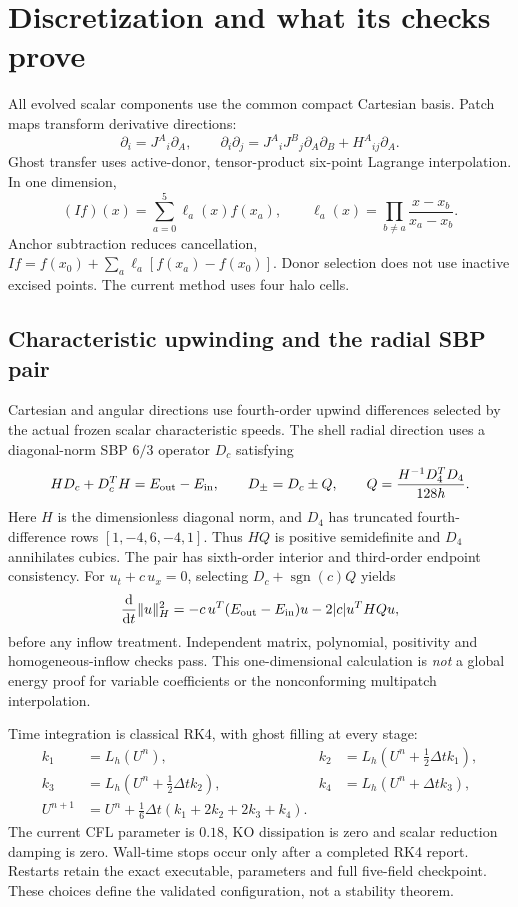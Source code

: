 \documentclass[11pt,letterpaper]{article}
\newcommand{\dd}{\mathrm{d}}
\begin{document}
\clearpage
\section{Discretization and what its checks prove}
All evolved scalar components use the common compact Cartesian basis. Patch maps transform derivative directions:
\begin{equation}
 \partial_i=J^A{}_i\partial_A,\qquad
 \partial_i\partial_j=J^A{}_iJ^B{}_j\partial_A\partial_B+H^A{}_{ij}\partial_A.
\end{equation}
Ghost transfer uses active-donor, tensor-product six-point Lagrange interpolation. In one dimension,
\begin{equation}
 (If)(x)=\sum_{a=0}^{5}\ell_a(x)f(x_a),\qquad
 \ell_a(x)=\prod_{b\ne a}\frac{x-x_b}{x_a-x_b}.
\end{equation}
Anchor subtraction reduces cancellation, $If=f(x_0)+\sum_a\ell_a[f(x_a)-f(x_0)]$. Donor selection does not use inactive excised points. The current method uses four halo cells.

\subsection{Characteristic upwinding and the radial SBP pair}
Cartesian and angular directions use fourth-order upwind differences selected by the actual frozen scalar characteristic speeds. The shell radial direction uses a diagonal-norm SBP $6/3$ operator $D_c$ satisfying
\begin{equation}
 HD_c+D_c^{T}H=E_{\rm out}-E_{\rm in},\qquad
 D_\pm=D_c\pm Q,\qquad Q=\frac{H^{-1}D_4^{T}D_4}{128h}.
\end{equation}
Here $H$ is the dimensionless diagonal norm, and $D_4$ has truncated fourth-difference rows $[1,-4,6,-4,1]$. Thus $HQ$ is positive semidefinite and $D_4$ annihilates cubics. The pair has sixth-order interior and third-order endpoint consistency. For $u_t+c\,u_x=0$, selecting $D_c+\operatorname{sgn}(c)Q$ yields
\begin{equation}
 \frac{\dd}{\dd t}\|u\|_H^2
 =-c\,u^T(E_{\rm out}-E_{\rm in})u-2|c|u^THQu,
\end{equation}
before any inflow treatment. Independent matrix, polynomial, positivity and homogeneous-inflow checks pass. This one-dimensional calculation is \emph{not} a global energy proof for variable coefficients or the nonconforming multipatch interpolation.

Time integration is classical RK4, with ghost filling at every stage:
\begin{align}
 k_1&=L_h(U^n),&k_2&=L_h(U^n+\tfrac12\Delta t k_1),\\
 k_3&=L_h(U^n+\tfrac12\Delta t k_2),&k_4&=L_h(U^n+\Delta t k_3),\\
 U^{n+1}&=U^n+\tfrac16\Delta t(k_1+2k_2+2k_3+k_4).&&
\end{align}
The current CFL parameter is $0.18$, KO dissipation is zero and scalar reduction damping is zero. Wall-time stops occur only after a completed RK4 report. Restarts retain the exact executable, parameters and full five-field checkpoint. These choices define the validated configuration, not a stability theorem.
\end{document}
